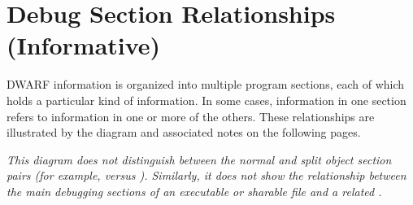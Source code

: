 \chapter{Debug Section Relationships (Informative)}
\label{app:debugsectionrelationshipsinformative}
DWARF information is organized into multiple program sections, 
each of which holds a particular kind of information. In some 
cases, information in one section refers to information in one 
or more of the others. These relationships are illustrated by 
the diagram and associated notes on the following pages.

\textit{This diagram does not distinguish between the normal
and split object section pairs (for example, \dotdebuginfo{} 
versus \dotdebuginfodwo). Similarly, it does not show the 
relationship between the main debugging sections of an executable
or sharable file and a related .}

